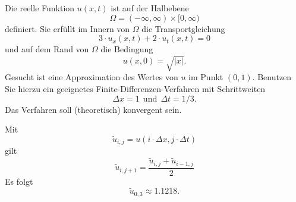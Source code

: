 Die reelle Funktion $u(x,t)$ ist auf der Halbebene 
\[
\Omega = (-\infty, \infty) \times [0,\infty)
\]
definiert. Sie erfüllt im Innern von $\Omega$ die Transportgleichung
\[
3 \cdot u_{x}(x,t) + 2 \cdot u_{t}(x,t) = 0
\]
und auf dem Rand von $\Omega$ die Bedingung 
\[
u(x,0) = \sqrt{|x|}.
\]
Gesucht ist eine Approximation des Wertes von $u$ im Punkt $(0,1)$.
Benutzen Sie hierzu ein geeignetes Finite-Differenzen-Verfahren
mit Schrittweiten
\[
\Delta x = 1 \ \ \mbox{und} \ \  \Delta t = 1/3.
\]
Das Verfahren soll (theoretisch) konvergent sein.

\begin{loesung}
Mit  
\[
\tilde u_{i,j} = u(i \cdot \Delta x, j \cdot \Delta t)
\]
gilt 
\[
\tilde u_{i,j+1} = \frac{\tilde u_{i,j} + \tilde u_{i-1,j}}{2}
\]
Es folgt 
\[
\tilde u_{0,3} \approx 1.1218.
\]
\end{loesung}
